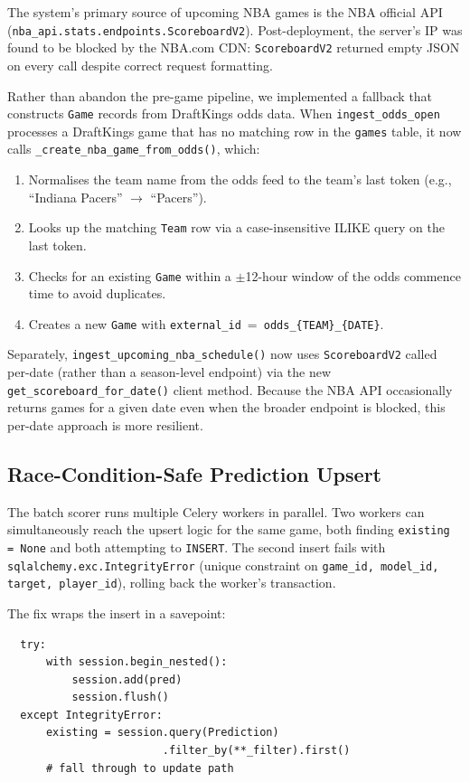 \documentclass[conference]{IEEEtran}
\begin{document}
The system's primary source of upcoming NBA games is the NBA
official API (\texttt{nba\_api.stats.endpoints.ScoreboardV2}).
Post-deployment, the server's IP was found to be blocked by the
NBA.com CDN: \texttt{ScoreboardV2} returned empty JSON on every
call despite correct request formatting.

Rather than abandon the pre-game pipeline, we implemented a fallback
that constructs \texttt{Game} records from DraftKings odds data.
When \texttt{ingest\_odds\_open} processes a DraftKings game that
has no matching row in the \texttt{games} table, it now calls
\texttt{\_create\_nba\_game\_from\_odds()}, which:

\begin{enumerate}
  \item Normalises the team name from the odds feed to the team's
        last token (e.g., ``Indiana Pacers'' $\to$ ``Pacers'').
  \item Looks up the matching \texttt{Team} row via a case-insensitive
        ILIKE query on the last token.
  \item Checks for an existing \texttt{Game} within a $\pm$12-hour
        window of the odds commence time to avoid duplicates.
  \item Creates a new \texttt{Game} with
        \texttt{external\_id}~=~\texttt{odds\_\{TEAM\}\_\{DATE\}}.
\end{enumerate}

Separately, \texttt{ingest\_upcoming\_nba\_schedule()} now uses
\texttt{ScoreboardV2} called per-date (rather than a season-level
endpoint) via the new \texttt{get\_scoreboard\_for\_date()} client
method.  Because the NBA API occasionally returns games for a
given date even when the broader endpoint is blocked, this
per-date approach is more resilient.

\subsection{Race-Condition-Safe Prediction Upsert}

The batch scorer runs multiple Celery workers in parallel.
Two workers can simultaneously reach the upsert logic for the same
game, both finding \texttt{existing = None} and both attempting to
\texttt{INSERT}.  The second insert fails with
\texttt{sqlalchemy.exc.IntegrityError} (unique constraint on
\texttt{game\_id, model\_id, target, player\_id}), rolling back
the worker's transaction.

The fix wraps the insert in a savepoint:
\begin{verbatim}
  try:
      with session.begin_nested():
          session.add(pred)
          session.flush()
  except IntegrityError:
      existing = session.query(Prediction)
                        .filter_by(**_filter).first()
      # fall through to update path
\end{verbatim}
\end{document}
